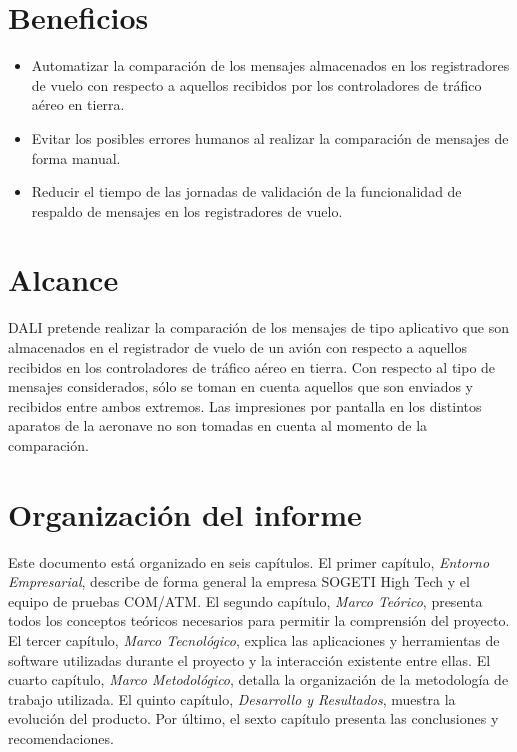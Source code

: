 \section*{Beneficios}

\begin{itemize}[noitemsep,nolistsep]
	\item Automatizar la comparación de los mensajes almacenados en los registradores de vuelo con respecto a aquellos recibidos por los controladores de tráfico aéreo en tierra. 
    \item Evitar los posibles errores humanos al realizar la comparación de mensajes de forma manual. 
    \item Reducir el tiempo de las jornadas de validación de la funcionalidad de respaldo de mensajes en los registradores de vuelo. 
\end{itemize}
 
\section*{Alcance}

DALI pretende realizar la comparación de los mensajes de tipo aplicativo que son almacenados en el registrador de vuelo de un avión con respecto a aquellos recibidos en los controladores de tráfico aéreo en tierra. Con respecto al tipo de mensajes considerados, sólo se toman en cuenta aquellos que son enviados y recibidos entre ambos extremos. Las impresiones por pantalla en los distintos aparatos de la aeronave no son tomadas en cuenta al momento de la comparación. 

\section*{Organización del informe}

Este documento está organizado en seis capítulos. El primer capítulo, \textit{Entorno Empresarial}, describe de forma general la empresa SOGETI High Tech y el equipo de pruebas COM/ATM. El segundo capítulo, \textit{Marco Teórico}, presenta todos los conceptos teóricos necesarios para permitir la comprensión del proyecto. El tercer capítulo, \textit{Marco Tecnológico}, explica las aplicaciones y herramientas de software utilizadas durante el proyecto y la interacción existente entre ellas. El cuarto capítulo, \textit{Marco Metodológico}, detalla la organización de la metodología de trabajo utilizada. El quinto capítulo, \textit{Desarrollo y Resultados}, muestra la evolución del producto. Por último, el sexto capítulo presenta las conclusiones y recomendaciones. 




